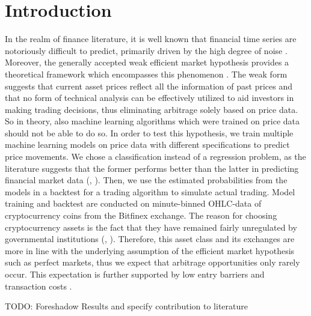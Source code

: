 \section{Introduction}
In the realm of finance literature, it is well known that financial time series
are notoriously difficult to predict, primarily driven by the high degree of noise \cite{fischer2017lstmMarketPrediction}.
Moreover, the generally accepted weak efficient market hypothesis provides a theoretical framework
which encompasses this phenomenon \cite{fama1970marketHypothesis}.
The weak form suggests that current asset prices reflect all the information of past prices 
and that no form of technical analysis can be effectively utilized to aid investors in making trading decisions,
thus eliminating arbitrage solely based on price data.
So in theory, also machine learning algorithms which were trained on price data 
should not be able to do so. 
In order to test this hypothesis, we train multiple machine learning models on price data with different
specifications to predict price movements. We chose a classification instead of a regression problem, as the literature
suggests that the former performs better than the latter in predicting financial market data
(\cite{leung2000classificationStockIndices}, \cite{enke2005classificationNN}).
Then, we use the estimated probabilities from the models in a backtest 
for a trading algorithm to simulate actual trading.
Model training and backtest are conducted on minute-binned OHLC-data of cryptocurrency coins from the 
Bitfinex exchange. The reason for choosing cryptocurrency assets is the fact that 
they have remained fairly unregulated by governmental institutions 
(\cite{dyhrberg2015bitcoinRegulations}, \cite{houben1994cryptoRegulation}).
Therefore, this asset class and its exchanges are more in line with the underlying assumption of the
efficient market hypothesis such as perfect markets, thus we expect that arbitrage opportunities only rarely occur. 
This expectation is further supported by low entry barriers and transaction costs \cite{bitfinex2012}.

TODO: Foreshadow Results and specify contribution to literature

